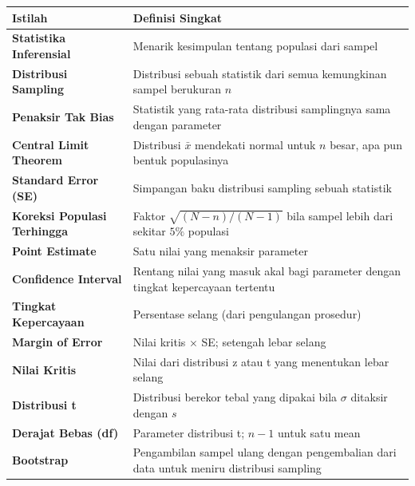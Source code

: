 \documentclass[
  indonesian,
  letterpaper,
]{book}
\newcounter{none} %
\begin{document}
{\def\LTcaptype{none} %
\begin{longtable}[]{@{}
  >{\raggedright\arraybackslash}p{}
  >{\raggedright\arraybackslash}p{}@{}}
\toprule\noalign{}
\begin{minipage}[b]{\linewidth}\raggedright
Istilah
\end{minipage} & \begin{minipage}[b]{\linewidth}\raggedright
Definisi Singkat
\end{minipage} \\
\midrule\noalign{}
\endhead
\bottomrule\noalign{}
\endlastfoot
\textbf{Statistika Inferensial} & Menarik kesimpulan tentang populasi
dari sampel \\
\textbf{Distribusi Sampling} & Distribusi sebuah statistik dari semua
kemungkinan sampel berukuran \(n\) \\
\textbf{Penaksir Tak Bias} & Statistik yang rata-rata distribusi
samplingnya sama dengan parameter \\
\textbf{Central Limit Theorem} & Distribusi \(\bar{x}\) mendekati normal
untuk \(n\) besar, apa pun bentuk populasinya \\
\textbf{Standard Error (SE)} & Simpangan baku distribusi sampling sebuah
statistik \\
\textbf{Koreksi Populasi Terhingga} & Faktor \(\sqrt{(N - n)/(N - 1)}\)
bila sampel lebih dari sekitar \(5\%\) populasi \\
\textbf{Point Estimate} & Satu nilai yang menaksir parameter \\
\textbf{Confidence Interval} & Rentang nilai yang masuk akal bagi
parameter dengan tingkat kepercayaan tertentu \\
\textbf{Tingkat Kepercayaan} & Persentase selang (dari pengulangan
prosedur) \\
\textbf{Margin of Error} & Nilai kritis \(\times\) SE; setengah lebar
selang \\
\textbf{Nilai Kritis} & Nilai dari distribusi z atau t yang menentukan
lebar selang \\
\textbf{Distribusi t} & Distribusi berekor tebal yang dipakai bila
\(\sigma\) ditaksir dengan \(s\) \\
\textbf{Derajat Bebas (df)} & Parameter distribusi t; \(n - 1\) untuk
satu mean \\
\textbf{Bootstrap} & Pengambilan sampel ulang dengan pengembalian dari
data untuk meniru distribusi sampling \\
\end{longtable}
}
\end{document}

